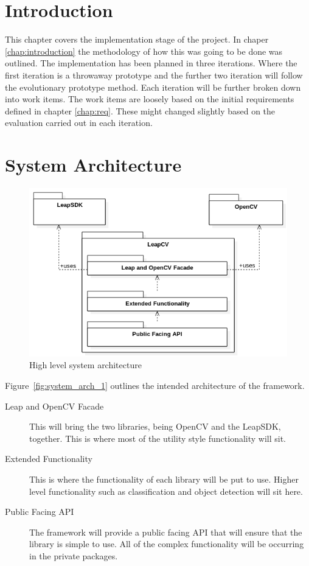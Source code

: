 \documentclass[11pt,oneside]{report}
\begin{document}
	\section{Introduction}
	This chapter covers the implementation stage of the project.
	In chaper \ref{chap:introduction} the methodology of how this was going to be done was outlined.
	The implementation has been planned in three iterations.
	Where the first iteration is a throwaway prototype and the further two iteration will follow the evolutionary prototype method.
	Each iteration will be further broken down into work items.
	The work items are loosely based on the initial requirements defined in chapter \ref{chap:req}.
	These might changed slightly based on the evaluation carried out in each iteration.
	\clearpage
	\section{System Architecture}
	\begin{figure}[ht]
			\begin{center}
    			\includegraphics[scale=0.65]{system_architecture_2}
    			\caption{High level system architecture \protect {\label{fig:system_arch_1}}}
    		\end{center}
			\end{figure}	
			
			Figure~\ref{fig:system_arch_1} outlines the intended architecture of the framework.
			\begin{description}
			\item[Leap and OpenCV Facade] This will bring the two libraries, being OpenCV and the LeapSDK, together.
			This is where most of the utility style functionality will sit.
			\item[Extended Functionality] This is where the functionality of each library will be put to use.
			Higher level functionality such as classification and object detection will sit here.
			\item[Public Facing API] The framework will provide a public facing API that will ensure that the library is simple to use.
			All of the complex functionality will be occurring in the private packages.
			\end{description}
			\clearpage
\end{document}
